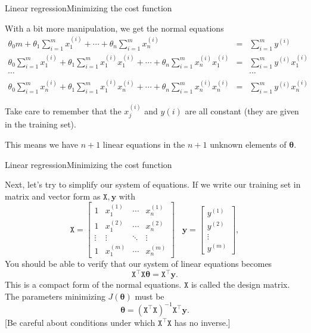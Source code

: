 \documentclass{beamer}
\renewcommand{\vec}[1]{\boldsymbol{#1}}
\newcommand{\mat}[1]{\mathtt{#1}}
\begin{document}
\begin{frame}{Linear regression}{Minimizing the cost function}

  With a bit more manipulation, we get the \alert{normal equations}
  \begin{eqnarray}
    \theta_0 m + \theta_1 \sum_{i=1}^mx_1^{(i)} + \cdots + \theta_n \sum_{i=1}^mx_n^{(i)} & = & \sum_{i=1}^m y^{(i)} \nonumber \\
    \theta_0 \sum_{i=1}^m x_1^{(i)}+ \theta_1 \sum_{i=1}^mx_1^{(i)}x_1^{(i)} + \cdots + \theta_n \sum_{i=1}^m x_n^{(i)}x_1^{(i)} & = & \sum_{i=1}^m y^{(i)}x_1^{(i)} \nonumber \\
    \cdots & & \cdots \nonumber \\
    \theta_0 \sum_{i=1}^m x_n^{(i)}+ \theta_1 \sum_{i=1}^mx_1^{(i)} x_n^{(i)}+ \cdots + \theta_n \sum_{i=1}^m x_n^{(i)}x_n^{(i)} & = & \sum_{i=1}^m y^{(i)}x_n^{(i)} \nonumber 
  \end{eqnarray}

  Take care to remember that the $x^{(i)}_j$ and $y{(i)}$ are all
  constant (they are given in the training set).

  \medskip

  This means we have $n+1$ linear equations in the $n+1$ unknown
  elements of $\vec{\theta}$.
  
\end{frame}


\begin{frame}{Linear regression}{Minimizing the cost function}

  Next, let's try to simplify our system of equations.
  If we write our training set in matrix and vector form as $\mat{X},
  \vec{y}$ with
  \[ \mat{X} = \begin{bmatrix}
    1 & x_1^{(1)} & \cdots & x_n^{(1)} \\
    1 & x_1^{(2)} & \cdots & x_n^{(2)} \\
    \vdots & \vdots & \ddots & \vdots \\ 
    1 & x_1^{(m)} & \cdots & x_n^{(m)} \end{bmatrix} \;\;\;
    \vec{y} = \begin{bmatrix}
    y^{(1)} \\ y^{(2)} \\ \vdots \\ y^{(m)}
    \end{bmatrix}, \]
    You should be able to verify that our system of linear equations
    becomes
    \[ \mat{X}^\top \mat{X} \vec{\theta} = \mat{X}^\top \vec{y}. \]
    This is a compact form of the normal equations. $\mat{X}$ is called
    the \alert{design matrix}.
    The parameters minimizing
    $J(\vec{\theta})$ must be
    \[ \vec{\theta} = (\mat{X}^\top \mat{X})^{-1}\mat{X}^\top \vec{y}. \]
       [Be careful about conditions under which $\mat{X}^\top \mat{X}$ has
         no inverse.]
\end{frame}
\end{document}
